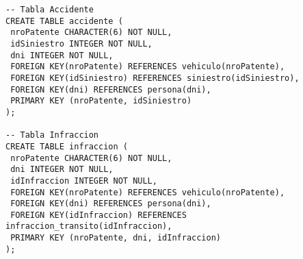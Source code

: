 \begin{verbatim}
-- Tabla Accidente
CREATE TABLE accidente (
 nroPatente CHARACTER(6) NOT NULL,
 idSiniestro INTEGER NOT NULL,
 dni INTEGER NOT NULL,
 FOREIGN KEY(nroPatente) REFERENCES vehiculo(nroPatente),
 FOREIGN KEY(idSiniestro) REFERENCES siniestro(idSiniestro),
 FOREIGN KEY(dni) REFERENCES persona(dni), 
 PRIMARY KEY (nroPatente, idSiniestro)
);

-- Tabla Infraccion
CREATE TABLE infraccion (
 nroPatente CHARACTER(6) NOT NULL,
 dni INTEGER NOT NULL,
 idInfraccion INTEGER NOT NULL,
 FOREIGN KEY(nroPatente) REFERENCES vehiculo(nroPatente),
 FOREIGN KEY(dni) REFERENCES persona(dni), 
 FOREIGN KEY(idInfraccion) REFERENCES infraccion_transito(idInfraccion), 
 PRIMARY KEY (nroPatente, dni, idInfraccion)
);

\end{verbatim}
